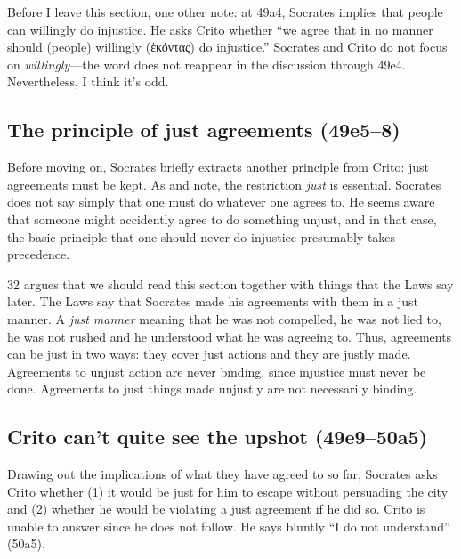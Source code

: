 \documentclass[12pt,letterpaper]{article}
\begin{document}
Before I leave this section, one other note: at 49a4, Socrates implies that people can willingly do injustice.
He asks Crito whether ``we agree that in no manner should (people) willingly (\textgreek{ἑκόντας}) do injustice.''
Socrates and Crito do not focus on \textit{willingly}---the word does not reappear in the discussion through 49e4.
Nevertheless, I think it's odd.

\subsection*{The principle of just agreements (49e5--8)}

Before moving on, Socrates briefly extracts another principle from Crito: just agreements must be kept.
As \cite{kraut-socrates-state-1984} and \cite{brickhouse-smith2004-plato-trial-of-socrates} note, the restriction \emph{just} is essential.
Socrates does not say simply that one must do whatever one agrees to.
He seems aware that someone might accidently agree to do something unjust, and in that case, the basic principle that one should never do injustice presumably takes precedence.

\cite{kraut-socrates-state-1984} 32 argues that we should read this section together with things that the Laws say later.
The Laws say that Socrates made his agreements with them in a just manner.
A \emph{just manner} meaning that he was not compelled, he was not lied to, he was not rushed and he understood what he was agreeing to.
Thus, agreements can be just in two ways: they cover just actions and they are justly made.
Agreements to unjust action are never binding, since injustice must never be done.
Agreements to just things made unjustly are not necessarily binding.

\subsection*{Crito can't quite see the upshot (49e9--50a5)}

Drawing out the implications of what they have agreed to so far, Socrates
asks Crito whether (1) it would be just for him to escape without
persuading the city and (2) whether he would be violating a just agreement
if he did so.
Crito is unable to answer since he does not follow.
He says bluntly ``I do not understand'' (50a5).
\end{document}
